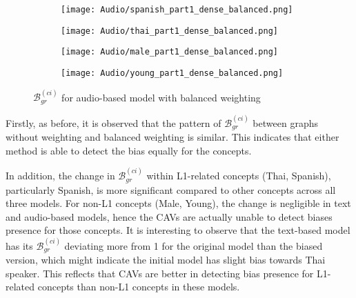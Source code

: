 \begin{figure}[H]
    \centering
    \begin{minipage}{0.23\textwidth}
        \begin{figure}[H]
            \centering
            \texttt{[image: Audio/spanish\_part1\_dense\_balanced.png]}
        \end{figure}
    \end{minipage}
    \begin{minipage}{0.23\textwidth}
        \begin{figure}[H]
            \centering
            \texttt{[image: Audio/thai\_part1\_dense\_balanced.png]}
        \end{figure}
    \end{minipage}
    \begin{minipage}{0.23\textwidth}
        \begin{figure}[H]
            \centering
            \texttt{[image: Audio/male\_part1\_dense\_balanced.png]}
        \end{figure}
    \end{minipage}
    \begin{minipage}{0.23\textwidth}
        \begin{figure}[H]
            \centering
            \texttt{[image: Audio/young\_part1\_dense\_balanced.png]}
        \end{figure}
    \end{minipage}
    \caption{$\mathcal{B}_{gr}^{(ci)}$ for audio-based model with balanced weighting}
    \label{fig:grad_audio_balanced}
\end{figure}

Firstly, as before, it is observed that the pattern of $\mathcal{B}^{(ci)}_{gr}$ between graphs without weighting and balanced weighting is similar. This indicates that either method is able to detect the bias equally for the concepts.

In addition, the change in $\mathcal{B}^{(ci)}_{gr}$ within L1-related concepts (Thai, Spanish), particularly Spanish, is more significant compared to other concepts across all three models. For non-L1 concepts (Male, Young), the change is negligible in text and audio-based models, hence the CAVs are actually unable to detect biases presence for those concepts. It is interesting to observe that the text-based model has its $\mathcal{B}^{(ci)}_{gr}$ deviating more from 1 for the original model than the biased version, which might indicate the initial model has slight bias towards Thai speaker. This reflects that CAVs are better in detecting bias presence for L1-related concepts than non-L1 concepts in these models.

